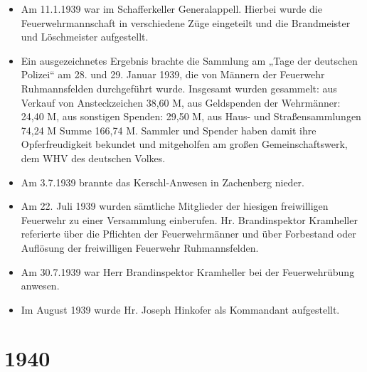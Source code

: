 \documentclass[12pt,a4paper]{book}
\begin{document}
\begin{itemize}
\item Am 11.1.1939 war im Schafferkeller Generalappell. Hierbei wurde die
Feuerwehrmannschaft in verschiedene Züge eingeteilt und die Brandmeister und
Löschmeister aufgestellt.

\item Ein ausgezeichnetes Ergebnis brachte die Sammlung am „Tage der deutschen
Polizei“ am 28. und 29. Januar 1939, die von Männern der Feuerwehr
Ruhmannsfelden durchgeführt wurde. Insgesamt wurden gesammelt: aus Verkauf von
Ansteckzeichen 38,60 M, aus Geldspenden der Wehrmänner: 24,40 M, aus sonstigen
Spenden: 29,50 M, aus Haus- und Straßensammlungen 74,24 M Summe 166,74 M.
Sammler und Spender haben damit ihre Opferfreudigkeit bekundet und mitgeholfen
am großen Gemeinschaftswerk, dem WHV des deutschen Volkes.

\item Am 3.7.1939 brannte das Kerschl-Anwesen in Zachenberg nieder.

\item Am 22. Juli 1939 wurden sämtliche Mitglieder der hiesigen freiwilligen
Feuerwehr zu einer Versammlung einberufen. Hr. Brandinspektor Kramheller
referierte über die Pflichten der Feuerwehrmänner und über Forbestand oder
Auflösung der freiwilligen Feuerwehr Ruhmannsfelden.

\item Am 30.7.1939 war Herr Brandinspektor Kramheller bei der Feuerwehrübung
anwesen.

\item Im August 1939 wurde Hr. Joseph Hinkofer als Kommandant aufgestellt.
\end{itemize}

\section*{1940}
\end{document}
